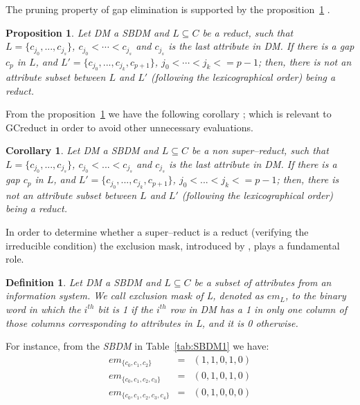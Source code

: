 \documentclass[authoryear,preprint,review,12pt]{elsarticle}
\newtheorem{proposition}{Proposition}
\newtheorem{definition}{Definition}
\newtheorem{corollary}{Corollary}
\begin{document}
	The pruning property of gap elimination is supported by the proposition~\ref{prop:gap} \citep{Santiesteban03}. 
%	
		
	\begin{proposition}\label{prop:gap} 
		Let DM a SBDM and $L \subseteq C$ be a reduct, such that $L = \lbrace c_{j_0},...,c_{j_s}\rbrace$, $c_{j_0}<\cdots	<c_{j_s}$ and $c_{j_s}$ is the last attribute in DM. If there is a gap $c_p$ in $L$, and $L' = \lbrace c_{j_0},...,c_{j_k},c_{p+1}\rbrace$, $j_0<\cdots <j_k<=p-1$; then, there is not an attribute subset between $L$ and $L'$ (following the lexicographical order) being a reduct.
	\end{proposition}	
	
	From the proposition~\ref{prop:gap} we have the following corollary \citep{Santiesteban03}; which is relevant to GCreduct in order to avoid other unnecessary evaluations.
	
	\begin{corollary}\label{coro:gap} 
		Let DM a SBDM and $L \subseteq C$ be a non super--reduct, such that $L = \lbrace c_{j_0},...,c_{j_s}\rbrace$, $c_{j_0}<...<c_{j_s}$ and $c_{j_s}$ is the last attribute in DM. If there is a gap $c_p$ in $L$, and $L' = \lbrace c_{j_0},...,c_{j_k},c_{p+1}\rbrace$, $j_0<...<j_k<=p-1$; then, there is not an attribute subset between $L$ and $L'$ (following the lexicographical order) being a reduct.
	\end{corollary}
		
	In order to determine whether a super--reduct is a reduct (verifying the irreducible condition) the
	exclusion mask, introduced by \cite{Lias09}, plays a fundamental role. 
	
	\begin{definition}\label{def:exclusion}
		Let DM a SBDM and $L \subseteq C$ be a subset of attributes from an information system. We call exclusion mask of L, denoted as $em_L$, to the binary word in which the $i^{\mathit{th}}$ bit is 1 if the $i^{\mathit{th}}$ row in DM has a 1 in only one column of those columns corresponding to attributes in L, and it is 0 otherwise.
	\end{definition}
	
	For instance, from the \textit{SBDM} in Table~\ref{tab:SBDM1} we have:
	$$\begin{array}{lcc}
	  em_{\lbrace c_0,c_1,c_2\rbrace}         &=& (1,1,0,1,0)\\
	  em_{\lbrace c_0,c_1,c_2,c_3\rbrace}     &=& (0,1,0,1,0)\\
	  em_{\lbrace c_0,c_1,c_2,c_3,c_4\rbrace} &=& (0,1,0,0,0)
	\end{array}$$
	
\end{document}
